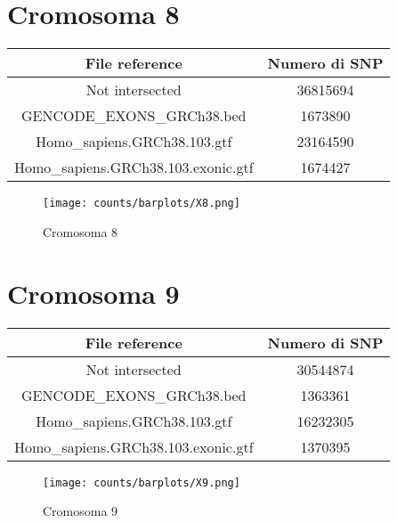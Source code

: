 \section*{Cromosoma 8}
  \begin{table}[H]\centering
	\begin{tabular}{|c|c|}
	  \hline
	  File reference & Numero di SNP \\
		\hline
		Not intersected & 36815694 \\
	  \hline
	  GENCODE\_EXONS\_GRCh38.bed & 1673890 \\
	  \hline
	  Homo\_sapiens.GRCh38.103.gtf & 23164590 \\
	  \hline
	  Homo\_sapiens.GRCh38.103.exonic.gtf & 1674427 \\
	  \hline
	\end{tabular}
  \end{table}
  \begin{figure}[H]
	\texttt{[image: counts/barplots/X8.png]}
	\caption{Cromosoma 8}
	\label{fig:chr8}
  \end{figure}

\section*{Cromosoma 9}
  \begin{table}[H]\centering
	\begin{tabular}{|c|c|}
	  \hline
	  File reference & Numero di SNP \\
		\hline
		Not intersected & 30544874 \\
	  \hline
	  GENCODE\_EXONS\_GRCh38.bed & 1363361 \\
	  \hline
	  Homo\_sapiens.GRCh38.103.gtf & 16232305 \\
	  \hline
	  Homo\_sapiens.GRCh38.103.exonic.gtf & 1370395 \\
	  \hline
	\end{tabular}
  \end{table}
  \begin{figure}[H]
	\texttt{[image: counts/barplots/X9.png]}
	\caption{Cromosoma 9}
	\label{fig:chr9}
  \end{figure}


